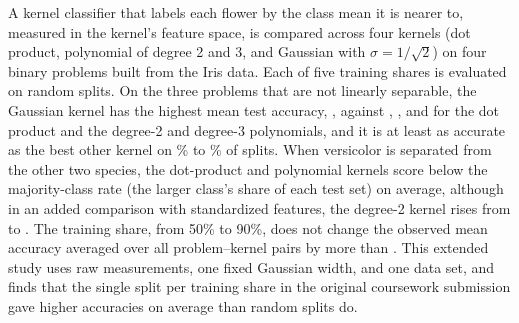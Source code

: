 A kernel classifier that labels each flower by the class mean it is nearer to, measured in the kernel's feature space, is compared across four kernels (dot product, polynomial of degree 2 and 3, and Gaussian with $\sigma = 1/\sqrt{2}$) on four binary problems built from the Iris data. Each of five training shares is evaluated on  random splits. On the three problems that are not linearly separable, the Gaussian kernel has the highest mean test accuracy, , against , , and  for the dot product and the degree-2 and degree-3 polynomials, and it is at least as accurate as the best other kernel on \% to \% of splits. When versicolor is separated from the other two species, the dot-product and polynomial kernels score below the majority-class rate (the larger class's share of each test set) on average, although in an added comparison with standardized features, the degree-2 kernel rises from  to . The training share, from 50\% to 90\%, does not change the observed mean accuracy averaged over all problem--kernel pairs by more than . This extended study uses raw measurements, one fixed Gaussian width, and one data set, and finds that the single split per training share in the original coursework submission gave higher accuracies on average than random splits do.

